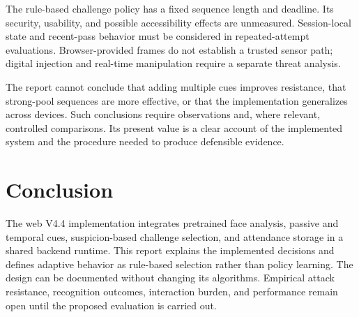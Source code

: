\documentclass[conference,a4paper]{IEEEtran}
\begin{document}
The rule-based challenge policy has a fixed sequence length and deadline. Its security, usability, and possible accessibility effects are unmeasured. Session-local state and recent-pass behavior must be considered in repeated-attempt evaluations. Browser-provided frames do not establish a trusted sensor path; digital injection and real-time manipulation require a separate threat analysis.

The report cannot conclude that adding multiple cues improves resistance, that strong-pool sequences are more effective, or that the implementation generalizes across devices. Such conclusions require observations and, where relevant, controlled comparisons. Its present value is a clear account of the implemented system and the procedure needed to produce defensible evidence.

\section{Conclusion}
The web V4.4 implementation integrates pretrained face analysis, passive and temporal cues, suspicion-based challenge selection, and attendance storage in a shared backend runtime. This report explains the implemented decisions and defines adaptive behavior as rule-based selection rather than policy learning. The design can be documented without changing its algorithms. Empirical attack resistance, recognition outcomes, interaction burden, and performance remain open until the proposed evaluation is carried out.
\end{document}
